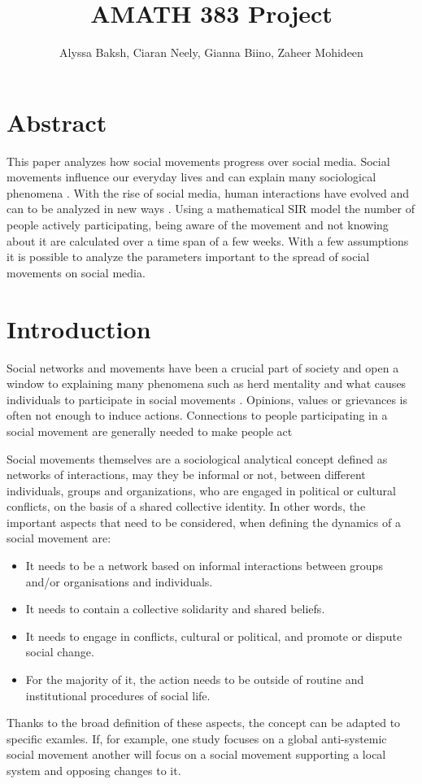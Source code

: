 \documentclass{article}
\title{AMATH 383 Project}
\author{
    Alyssa Baksh, 
    Ciaran Neely,
    Gianna Biino,
    Zaheer Mohideen
}
\begin{document}
    \maketitle

    \section{Abstract}
    This paper analyzes how social movements progress over social media. Social movements influence our everyday lives and can explain many sociological phenomena \cite{diani_networks_2013}. With the rise of social media, human interactions have evolved and can to be analyzed in new ways \cite{kidd_social_2016}. Using a mathematical SIR model the number of people actively participating, being aware of the movement and not knowing about it are calculated over a time span of a few weeks. With a few assumptions it is possible to analyze the parameters important to the spread of social movements on social media. 
    
    \section{Introduction}
    Social networks and movements have been a crucial part of society and open a window to explaining many phenomena such as herd mentality and what causes individuals to participate in social movements \cite{diani_networks_2013}. Opinions, values or grievances is often not enough to induce actions. Connections to people participating in a social movement are generally needed to make people act \cite{diani_networks_2013}
    
    Social movements themselves are a sociological analytical concept defined as networks of interactions, may they be informal or not, between different individuals, groups and organizations, who are engaged in political or cultural conflicts, on the basis of a shared collective identity. In other words, the important aspects that need to be considered, when defining the dynamics of a social movement are: 
    \begin{itemize}
    \item It needs to be a network based on informal interactions between groups and/or organisations and individuals.
    \item It needs to contain a collective solidarity and shared beliefs.
    \item It needs to engage in conflicts, cultural or political, and promote or dispute social change.
    \item  For the majority of it, the action needs to be outside of routine and institutional procedures of social life.
    \end{itemize}
    Thanks to the broad definition of these aspects, the concept can be adapted to specific examles. If, for example, one study focuses on a global anti-systemic social movement another will focus on a social movement supporting a local system and opposing changes to it. \cite{diani_concept_1992}
    
\end{document}
